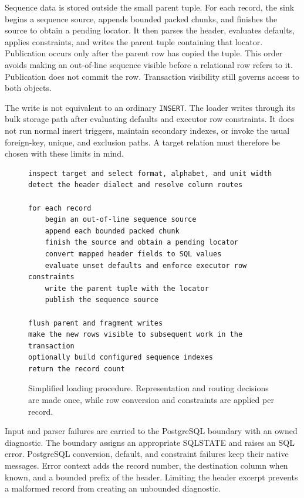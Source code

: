 Sequence data is stored outside the small parent tuple. For each record, the
sink begins a sequence source, appends bounded packed chunks, and finishes the
source to obtain a pending locator. It then parses the header, evaluates
defaults, applies constraints, and writes the parent tuple containing that
locator. Publication occurs only after the parent row has copied the tuple.
This order avoids making an out-of-line sequence visible before a relational
row refers to it. Publication does not commit the row. Transaction visibility
still governs access to both objects.

The write is not equivalent to an ordinary \texttt{INSERT}. The loader writes
through its bulk storage path after evaluating defaults and executor row
constraints. It does not run normal insert triggers, maintain secondary
indexes, or invoke the usual foreign-key, unique, and exclusion paths. A target
relation must therefore be chosen with these limits in mind.

\begin{figure}[htbp]
\centering
\begin{minipage}{0.90\textwidth}
\small
\begin{verbatim}
inspect target and select format, alphabet, and unit width
detect the header dialect and resolve column routes

for each record
    begin an out-of-line sequence source
    append each bounded packed chunk
    finish the source and obtain a pending locator
    convert mapped header fields to SQL values
    evaluate unset defaults and enforce executor row constraints
    write the parent tuple with the locator
    publish the sequence source

flush parent and fragment writes
make the new rows visible to subsequent work in the transaction
optionally build configured sequence indexes
return the record count
\end{verbatim}
\end{minipage}
\caption{Simplified loading procedure. Representation and routing decisions
are made once, while row conversion and constraints are applied per record.}
\label{fig:io-load-pseudocode}
\end{figure}

Input and parser failures are carried to the PostgreSQL boundary with an owned
diagnostic. The boundary assigns an appropriate SQLSTATE and raises an SQL
error. PostgreSQL conversion, default, and constraint failures keep their
native messages. Error context adds the record number, the destination column
when known, and a bounded prefix of the header. Limiting the header excerpt
prevents a malformed record from creating an unbounded diagnostic.

